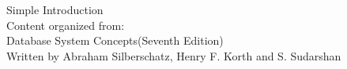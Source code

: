 \thispagestyle{empty}
\begin{titlepage}
\thispagestyle{empty}
    \begin{center}
    {\makeatletter
    \ifdefvoid{\@bookseries}{}{\bigskip\normalfont\fontsize{20}{20}\selectfont\@bookseries}
    \makeatother}
        \bigskip

        \bigskip

        \bigskip
    {\makeatletter
    \fontsize{35}{35}\rmfamily\bfseries\selectfont\@title
    \makeatother}
    \bigskip

    \bigskip

    \bigskip

    \bigskip

    \bigskip
    {\makeatletter
    \fontsize{25}{25}\rmfamily\selectfont\@author
    \makeatother}
    \bigskip

    \bigskip    

    \vfill

    \bigskip
    
    \bigskip
    {\makeatletter
    \fontsize{25}{25}\rmfamily\selectfont\@pressname
    \makeatother}
    \end{center}
    \end{titlepage}
    \let\cleardoublepage\clearpage
    \thispagestyle{empty}
    \begin{center}
        {\fontsize{20}{20}\rmfamily\selectfont    Simple Introduction}\\ 
        \bigskip
        Content organized from:
        \\
        Database System Concepts(Seventh Edition)
        \\
        Written by Abraham Silberschatz, Henry F. Korth and S. Sudarshan
        \vfill
    \end{center}





